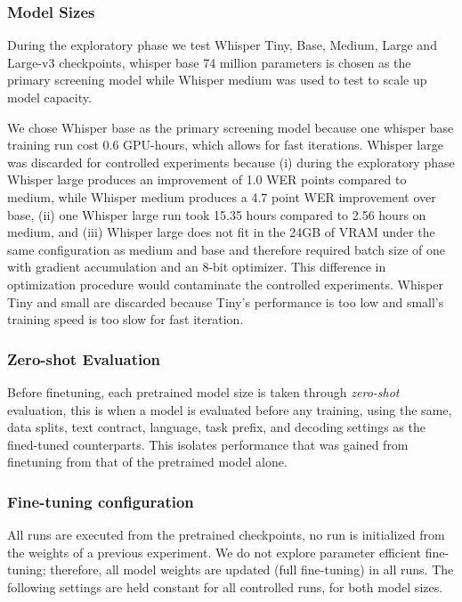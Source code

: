 {\subsubsection{Model Sizes}

During the exploratory phase we test Whisper Tiny, Base, Medium, Large and Large-v3 checkpoints, whisper base 74 million parameters is chosen as the primary screening model while Whisper medium was used to test to scale up model capacity. 

We chose Whisper base as the primary screening model because one whisper base training run cost 0.6 GPU-hours, which allows for fast iterations. Whisper large was discarded for controlled experiments because (i) during the exploratory phase Whisper large produces an improvement of 1.0 WER points compared to medium, while Whisper medium produces a 4.7 point WER improvement over base, (ii) one Whisper large run took 15.35 hours compared to 2.56 hours on medium, and (iii) Whisper large does not fit in the 24GB of VRAM under the same configuration as medium and base and therefore required batch size of one with gradient accumulation and an 8-bit optimizer. This difference in optimization procedure would contaminate the controlled experiments. Whisper Tiny and small are discarded because Tiny's performance is too low and small's training speed is too slow for fast iteration. 

\subsubsection{Zero-shot Evaluation}
Before finetuning, each pretrained model size is taken through \emph{zero-shot} evaluation, this is when a model is evaluated before any training, using the same, data splits, text contract, language, task prefix, and decoding settings as the fined-tuned counterparts. This isolates performance that was gained from finetuning from that of the pretrained model alone. 

\subsubsection{Fine-tuning configuration}
\label{sec:finetuning}
All runs are executed from the pretrained checkpoints, no run is initialized from the weights of a previous experiment. We do not explore parameter efficient fine-tuning; therefore, all model weights are updated (full fine-tuning) in all runs.
The following settings are held constant for all controlled runs, for both model sizes.

}

